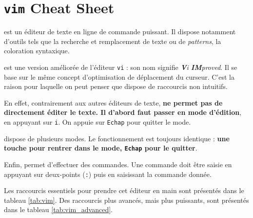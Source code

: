 \section{\texttt{vim} Cheat Sheet} \label{appendix:vim}

 est un éditeur de texte en ligne de commande puissant. Il dispose notamment d'outils tels que la recherche et remplacement de texte ou de \textit{patterns}, la coloration syntaxique.

 est une version améliorée de l'éditeur \texttt{vi} : son nom signifie \textit{\textbf{V}i \textbf{IM}proved}. Il se base sur le même concept d'optimisation de déplacement du curseur. C'est la raison pour laquelle on peut penser que  dispose de raccourcis non intuitifs.

En effet, contrairement aux autres éditeurs de texte,  \textbf{ne permet pas de directement éditer le texte. Il d'abord faut passer en mode d'édition}, en appuyant sur \texttt{i}. On appuie sur \texttt{Echap} pour quitter le mode.

 dispose de plusieurs modes. Le fonctionnement est toujours identique : \textbf{une touche pour rentrer dans le mode, \texttt{Echap} pour le quitter}.

Enfin,  permet d'effectuer des commandes. Une commande doit être saisie en appuyant sur deux-points (\texttt{:}) puis en saisissant la commande donnée.

Les raccourcis essentiels pour prendre cet éditeur en main sont présentés dans le tableau \ref{tab:vim}. Des raccourcis plus avancés, mais plus puissants, sont présentés dans le tableau \ref{tab:vim_advanced}.

